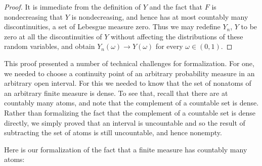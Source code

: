\documentclass[leqno]{article}
\theoremstyle{definition}
\begin{document}
\begin{proof}
It is immediate from the definition of $Y$ and the fact that $F$ is nondecreasing that $Y$ is nondecreasing, and hence has at most countably many discontinuities, a set of Lebesgue measure zero. Thus we may redefine $Y_n$, $Y$ to be zero at all the discontinuities of $Y$ without affecting the distributions of these random variables, and obtain $Y_n(\omega) \rightarrow Y(\omega)$ for every $\omega \in (0,1)$.
\end{proof}

This proof presented a number of technical challenges for formalization. For one, we needed to choose a continuity point of an arbitrary probability measure in an arbitrary  open interval. For this we needed to know that the set of nonatoms of an arbitrary finite measure is dense. To see that, recall that there are at countably many atoms, and note that the complement of a countable set is dense. Rather than formalizing the fact that the complement of a countable set is dense directly, we simply proved that an interval is uncountable and so the result of subtracting the set of atoms is still uncountable, and hence nonempty.

Here is our formalization of the fact that a finite measure has countably many atoms:

\medskip
\end{document}
